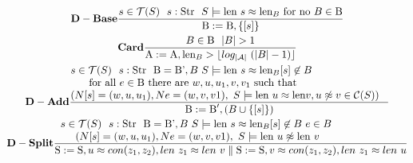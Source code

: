 \begin{gather*}\label{eA1}

 \bold{D-Base} \frac
 { s \in \mathcal{T}(S) \ \ s: \textnormal{Str}  \ \  S \models \textnormal{len} \ s \approx \textnormal{len}_B \textnormal{ for no }  B \in \textnormal{B} }
 { \textnormal{B}:= \textnormal{B}, \{ [s]\}}\\
  \bold{Card} \frac
  {B \in \textnormal{B} \ \ |B| > 1}
  { \textnormal{A}:= \textnormal{A}, \textnormal{len}_B >  \lfloor  log_{| \mathcal{A}|}  \ ( |B| -1) \rfloor }\\
  \bold{D-Add} \frac
  { \parbox{4.2in}{$s \in \mathcal{T}(S) \ \ s: \textnormal{Str} \ \ \textnormal{B} = \textnormal{B'}, B \   S \models \textnormal{len} \ s \approx \textnormal{len}_B  [s]  \not\in B 
  		$ \\
  		\hspace*{0.5cm}$  		\textnormal{ for all }  e \in \textnormal{B} \textnormal{ there are } w, u,u_1, v,v_1 \textnormal{ such that} 
  		 $ \\
  		 \hspace*{0.0cm}$ (N [s] = (w, u,u_1), N e = (w, v,v1), \ S \models \textnormal{len} \ u \approx \textnormal{len} v, u \not\approx v \in \mathcal{C}(S))$}}
  { \textnormal{B}:= \textnormal{B}', ( B \cup \{ [s]\})}\\
  \bold{D-Split} \frac
  { \parbox{4.5in}{$s \in \mathcal{T}(S) \ \ s: \textnormal{Str} \ \ \textnormal{B} = \textnormal{B'}, B \   S \models \textnormal{len} \ s \approx \textnormal{len}_B  [s]  \not\in B \ e \in B   		 
  		$ \\
  		\hspace*{0.5cm}$ (N [s] = (w, u,u_1), N e = (w, v,v1), \ S \models \textnormal{len} \ u \not\approx \textnormal{len}\ v $}}
  {  \textnormal{S}:=\textnormal{S}, u \approx con(z_1, z_2), len \ z_1 \approx len \ v  \parallel  \textnormal{S}:=\textnormal{S}, v \approx con(z_1, z_2), len \ z_1 \approx len \ u}
  \end{gather*}